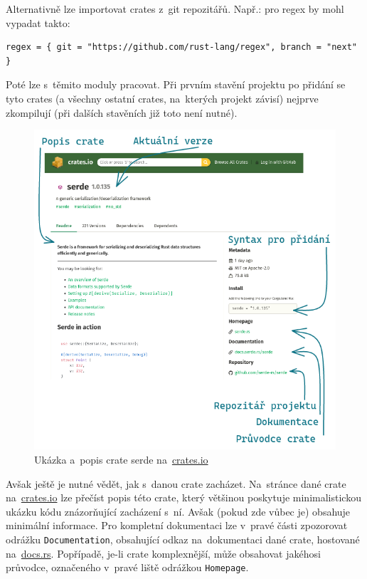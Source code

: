 \documentclass[a4paper, 12pt, twoside]{article} %
\begin{document}
			Alternativně lze importovat crates z~git repozitářů. Např.: pro regex by mohl vypadat takto:
			\begin{verbatim}
regex = { git = "https://github.com/rust-lang/regex", branch = "next" }
			\end{verbatim}

			Poté lze s~těmito moduly pracovat. Při prvním stavění projektu po přidání se tyto crates (a všechny ostatní crates, na~kterých projekt závisí) nejprve zkompilují (při dalších stavěních již toto není nutné).
			\begin{center}
				\begin{figure}[H]
					\centering
					\includegraphics[width=0.95\linewidth]{cratesio}
					\caption{Ukázka a~popis crate serde na~\href{https://crates.io}{crates.io}}
					\label{fig:cratesio}
				\end{figure}
			\end{center}
			
			Avšak ještě je nutné vědět, jak s~danou crate zacházet. Na~stránce dané crate na~\href{https://crates.io}{crates.io} lze přečíst popis této crate, který většinou poskytuje minimalistickou ukázku kódu znázorňující zacházení s~ní. Avšak (pokud zde vůbec je) obsahuje minimální informace. Pro kompletní dokumentaci lze v~pravé části zpozorovat odrážku \texttt{Documentation}, obsahující odkaz na~dokumentaci dané crate, hostované na~\href{https://docs.rs/}{docs.rs}. Popřípadě, je-li crate komplexnější, může obsahovat jakéhosi průvodce, označeného v~pravé liště odrážkou \texttt{Homepage}.
\end{document}
